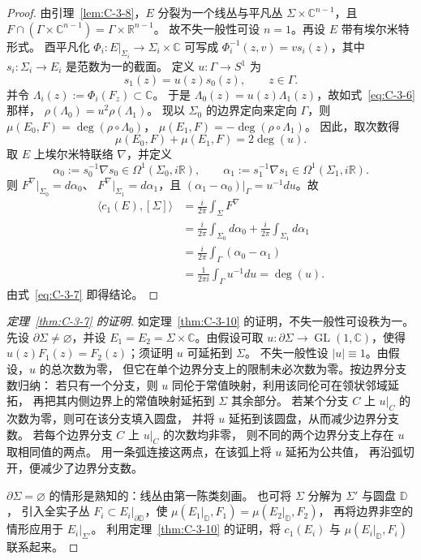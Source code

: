 \begin{proof}
由引理~\ref{lem:C-3-8}，$E$ 分裂为一个线丛与平凡丛
$\Sigma\times\mathbb C^{n-1}$，且
$F\cap(\Gamma\times\mathbb C^{n-1})=\Gamma\times\mathbb R^{n-1}$。
故不失一般性可设 $n=1$。再设 $E$ 带有埃尔米特形式。
酉平凡化 $\Phi_i:E|_{\Sigma_i}\to\Sigma_i\times\mathbb C$
可写成 $\Phi_i^{-1}(z,v)=v s_i(z)$，其中 $s_i:\Sigma_i\to E_i$ 是范数为一的截面。
定义 $u:\Gamma\to S^1$ 为
\[
  s_1(z)=u(z)s_0(z),\qquad z\in\Gamma.
\]
并令 $\Lambda_i(z):=\Phi_i(F_z)\subset\mathbb C$。
于是 $\Lambda_0(z)=u(z)\Lambda_1(z)$，故如式~\eqref{eq:C-3-6} 那样，
$\rho(\Lambda_0)=u^2\rho(\Lambda_1)$。
现以 $\Sigma_0$ 的边界定向来定向 $\Gamma$，则
$\mu(E_0,F)=\deg(\rho\circ\Lambda_0)$，
$\mu(E_1,F)=-\deg(\rho\circ\Lambda_1)$。
因此，取次数得
\begin{equation}\label{eq:C-3-7}
  \mu(E_0,F)+\mu(E_1,F)=2\deg(u).
\end{equation}
取 $E$ 上埃尔米特联络 $\nabla$，并定义
\[
  \alpha_0:=s_0^{-1}\nabla s_0\in\Omega^1(\Sigma_0,i\mathbb R),\qquad
  \alpha_1:=s_1^{-1}\nabla s_1\in\Omega^1(\Sigma_1,i\mathbb R).
\]
则 $F^\nabla|_{\Sigma_0}=d\alpha_0$、
$F^\nabla|_{\Sigma_1}=d\alpha_1$，且
$(\alpha_1-\alpha_0)|_\Gamma=u^{-1}du$。故
\begin{align*}
  \langle c_1(E),[\Sigma]\rangle
  &=\frac{i}{2\pi}\int_\Sigma F^\nabla\\
  &=\frac{i}{2\pi}\int_{\Sigma_0}d\alpha_0
    +\frac{i}{2\pi}\int_{\Sigma_1}d\alpha_1\\
  &=\frac{i}{2\pi}\int_\Gamma(\alpha_0-\alpha_1)\\
  &=\frac{1}{2\pi i}\int_\Gamma u^{-1}du
  =\deg(u).
\end{align*}
由式~\eqref{eq:C-3-7} 即得结论。
\end{proof}

\begin{proof}[定理~\ref{thm:C-3-7} 的证明]
如定理~\ref{thm:C-3-10} 的证明，不失一般性可设秩为一。
先设 $\partial\Sigma\ne\varnothing$，并设
$E_1=E_2=\Sigma\times\mathbb C$。由假设可取
$u:\partial\Sigma\to\operatorname{GL}(1,\mathbb C)$，使得
$u(z)F_1(z)=F_2(z)$；须证明 $u$ 可延拓到 $\Sigma$。
不失一般性设 $|u|\equiv1$。由假设，$u$ 的总次数为零，
但它在单个边界分支上的限制未必次数为零。按边界分支数归纳：
若只有一个分支，则 $u$ 同伦于常值映射，利用该同伦可在领状邻域延拓，
再把其内侧边界上的常值映射延拓到 $\Sigma$ 其余部分。
若某个分支 $C$ 上 $u|_C$ 的次数为零，则可在该分支填入圆盘，
并将 $u$ 延拓到该圆盘，从而减少边界分支数。
若每个边界分支 $C$ 上 $u|_C$ 的次数均非零，
则不同的两个边界分支上存在 $u$ 取相同值的两点。
用一条弧连接这两点，在该弧上将 $u$ 延拓为公共值，
再沿弧切开，便减少了边界分支数。

$\partial\Sigma=\varnothing$ 的情形是熟知的：线丛由第一陈类刻画。
也可将 $\Sigma$ 分解为 $\Sigma'$ 与圆盘 $\mathbb D$，
引入全实子丛 $F_i\subset E_i|_{\partial\mathbb D}$，使
$\mu(E_1|_{\mathbb D},F_1)=\mu(E_2|_{\mathbb D},F_2)$，
再将边界非空的情形应用于 $E_i|_{\Sigma'}$。
利用定理~\ref{thm:C-3-10} 的证明，将 $c_1(E_i)$
与 $\mu(E_i|_{\mathbb D},F_i)$ 联系起来。
\end{proof}
